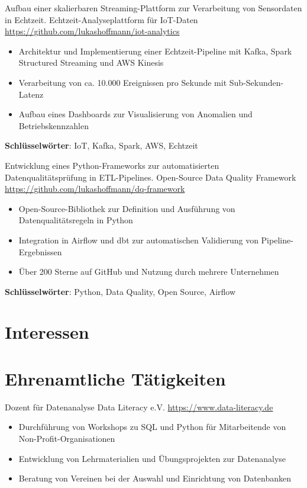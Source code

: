 \documentclass[a4paper, serif, 10pt]{moderncv}
\begin{document}
        {Aufbau einer skalierbaren Streaming-Plattform zur Verarbeitung von Sensordaten in Echtzeit.}
        {Echtzeit-Analyseplattform für IoT-Daten}
        {\url{https://github.com/lukashoffmann/iot-analytics}}
        {}
        {\begin{itemize}
\item Architektur und Implementierung einer Echtzeit-Pipeline mit Kafka, Spark Structured Streaming und AWS Kinesis
\item Verarbeitung von ca. 10.000 Ereignissen pro Sekunde mit Sub-Sekunden-Latenz
\item Aufbau eines Dashboards zur Visualisierung von Anomalien und Betriebskennzahlen
\end{itemize}
\textbf{Schlüsselwörter}: IoT, Kafka, Spark, AWS, Echtzeit}

        {Entwicklung eines Python-Frameworks zur automatisierten Datenqualitätsprüfung in ETL-Pipelines.}
        {Open-Source Data Quality Framework}
        {\url{https://github.com/lukashoffmann/dq-framework}}
        {}
        {\begin{itemize}
\item Open-Source-Bibliothek zur Definition und Ausführung von Datenqualitätsregeln in Python
\item Integration in Airflow und dbt zur automatischen Validierung von Pipeline-Ergebnissen
\item Über 200 Sterne auf GitHub und Nutzung durch mehrere Unternehmen
\end{itemize}
\textbf{Schlüsselwörter}: Python, Data Quality, Open Source, Airflow}
\section{Interessen}

\section{Ehrenamtliche Tätigkeiten}

        {Dozent für Datenanalyse}
        {Data Literacy e.V.}
        {\url{https://www.data-literacy.de}}
        {}
        {\begin{itemize}
\item Durchführung von Workshops zu SQL und Python für Mitarbeitende von Non-Profit-Organisationen
\item Entwicklung von Lehrmaterialien und Übungsprojekten zur Datenanalyse
\item Beratung von Vereinen bei der Auswahl und Einrichtung von Datenbanken
\end{itemize}}
    
\end{document}
